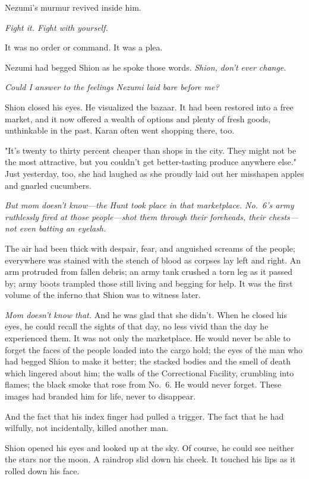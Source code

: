 Nezumi's murmur revived inside him.

\emph{Fight it. Fight with yourself.}

It was no order or command. It was a plea.

Nezumi had begged Shion as he spoke those words. \emph{Shion, don't ever
change.}

\emph{Could I answer to the feelings Nezumi laid bare before me?}

Shion closed his eyes. He visualized the bazaar. It had been restored
into a free market, and it now offered a wealth of options and plenty of
fresh goods, unthinkable in the past. Karan often went shopping there,
too.

"It's twenty to thirty percent cheaper than shops in the city. They
might not be the most attractive, but you couldn't get better-tasting
produce anywhere else." Just yesterday, too, she had laughed as she
proudly laid out her misshapen apples and gnarled cucumbers.

\emph{But mom doesn't know---the Hunt took place in that marketplace. No.~6's
army ruthlessly fired at those people---shot them through their foreheads,
their chests---not even batting an eyelash.}

The air had been thick with despair, fear, and anguished screams of the
people; everywhere was stained with the stench of blood as corpses lay
left and right. An arm protruded from fallen debris; an army tank
crushed a torn leg as it passed by; army boots trampled those still
living and begging for help. It was the first volume of the inferno that
Shion was to witness later.

\emph{Mom doesn't know that.} And he was glad that she didn't. When he closed
his eyes, he could recall the sights of that day, no less vivid than the
day he experienced them. It was not only the marketplace. He would never
be able to forget the faces of the people loaded into the cargo hold;
the eyes of the man who had begged Shion to make it better; the stacked
bodies and the smell of death which lingered about him; the walls of the
Correctional Facility, crumbling into flames; the black smoke that rose
from No.~6. He would never forget. These images had branded him for
life, never to disappear.

And the fact that his index finger had pulled a trigger. The fact that
he had wilfully, not incidentally, killed another man.

Shion opened his eyes and looked up at the sky. Of course, he could see
neither the stars nor the moon. A raindrop slid down his cheek. It
touched his lips as it rolled down his face.

